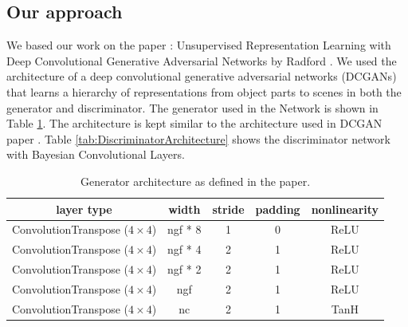 \subsection{Our approach}

We based our work on the paper :  Unsupervised Representation Learning with Deep Convolutional Generative Adversarial Networks by Radford \cite{DBLP:journals/corr/RadfordMC15}. We used the architecture of a deep convolutional generative adversarial networks (DCGANs) that learns a hierarchy of representations from object parts to scenes in both the generator and discriminator.
The generator used in the Network is shown in Table \ref{tab:GeneratorArchitecture}. The architecture is kept similar to the architecture used in DCGAN paper \cite{DBLP:journals/corr/RadfordMC15}. Table \ref{tab:DiscriminatorArchitecture} shows the discriminator network with Bayesian Convolutional Layers. 

\begin{table}[H]
    \centering
    \renewcommand{\arraystretch}{2}
    \begin{tabular}{c c c c c} 
 \hline
 layer type & width & stride & padding & nonlinearity \\ [0.5ex] 
 \hline
 ConvolutionTranspose ($4\times4$) & ngf * 8 & 1 & 0  & ReLU \\ 
 

 ConvolutionTranspose ($4\times4$) & ngf * 4 & 2 & 1  & ReLU \\
 
 
 ConvolutionTranspose ($4\times4$) & ngf * 2 & 2 & 1 & ReLU \\
 
 ConvolutionTranspose ($4\times4$) & ngf & 2 & 1  & ReLU \\
 
 ConvolutionTranspose ($4\times4$) & nc & 2 & 1 & TanH \\ [1ex] 
 \hline
\end{tabular}
\renewcommand{\arraystretch}{1}
\caption{Generator architecture as defined in the paper. \cite{DBLP:journals/corr/RadfordMC15}}
\label{tab:GeneratorArchitecture}
\end{table}

